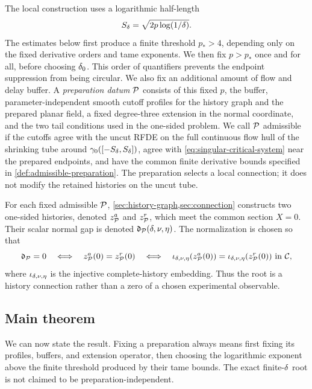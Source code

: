 The local construction uses a logarithmic half-length
\begin{equation}
\label{eq:Sdelta}
 S_\delta=\sqrt{2p\log(1/\delta)}.
\end{equation}
The estimates below first produce a finite threshold \(p_*>4\), depending
only on the fixed derivative orders and tame exponents.  We then fix
\(p>p_*\) once and for all, before choosing \(\delta_0\).  This order of
quantifiers prevents the endpoint suppression from being circular.  We also
fix an additional amount of flow and delay buffer.  A
\emph{preparation datum} \(\mathcal P\) consists of this fixed \(p\), the buffer,
parameter-independent smooth cutoff profiles for the history graph and the
prepared planar field, a fixed degree-three extension in the normal
coordinate, and the two tail conditions used in the one-sided problem.  We
call \(\mathcal P\) admissible if the cutoffs agree with the uncut RFDE on the full
continuous flow hull of the shrinking tube around
\(\gamma_0([-S_\delta,S_\delta])\), agree with \cref{eq:singular-critical-system}
near the prepared endpoints, and have the common finite derivative bounds
specified in \cref{def:admissible-preparation}.  The preparation selects a local
connection; it does not modify the retained histories on the uncut tube.

For each fixed admissible \(\mathcal P\), \cref{sec:history-graph,sec:connection}
constructs two one-sided histories, denoted \(z^a_\mathcal P\) and \(z^r_\mathcal P\),
which meet the common section \(X=0\).  Their scalar normal gap is denoted
\(\mathfrak d_\mathcal P(\delta,\nu,\eta)\).  The normalization is chosen so that
\begin{equation}
\label{eq:gap-equivalence-preview}
 \mathfrak d_\mathcal P=0
 \quad\Longleftrightarrow\quad
 z^a_\mathcal P(0)=z^r_\mathcal P(0)
 \quad\Longleftrightarrow\quad
 \iota_{\delta,\nu,\eta}(z^a_\mathcal P(0))
 =\iota_{\delta,\nu,\eta}(z^r_\mathcal P(0))\ \hbox{in }\mathcal C,
\end{equation}
where \(\iota_{\delta,\nu,\eta}\) is the injective complete-history embedding.
Thus the
root is a history connection rather than a zero of a chosen experimental
observable.

\subsection{Main theorem}

We can now state the result.  Fixing a preparation always means first
fixing its profiles, buffers, and extension operator, then choosing the
logarithmic exponent above the finite threshold produced by their tame
bounds.  The exact finite-\(\delta\) root is not claimed to be
preparation-independent.

